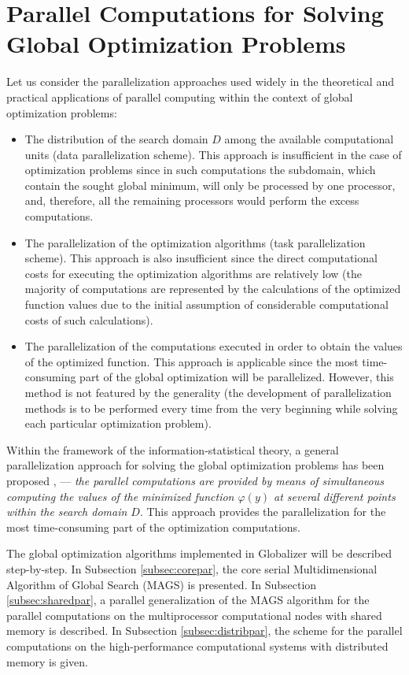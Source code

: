 \documentclass{naco}
\theoremstyle{definition}
\begin{document}
\section{Parallel Computations for Solving Global Optimization Problems}
\label{sec:parallel}
Let us consider the parallelization approaches used widely in the theoretical and
practical applications of parallel computing within the context of global optimization problems:
\begin{itemize}
  \item The distribution of the search domain \(D\) among the available computational units (data parallelization scheme). This approach is insufficient in the case of optimization problems since in such computations the subdomain, which contain the sought global minimum, will only be processed by one processor, and, therefore, all the remaining processors would perform the excess computations.
  \item The parallelization of the optimization algorithms (task parallelization scheme). This approach is also insufficient since the direct computational costs for executing the optimization algorithms are relatively low (the majority of computations are represented by the calculations of the optimized function values due to the initial assumption of considerable computational costs of such calculations).
  \item The parallelization of the computations executed in order to obtain the values of the optimized function. This approach is applicable since the most time-consuming part of the global optimization will be parallelized. However, this method is not featured by the generality (the development of parallelization methods is to be performed every time from the very beginning while solving each particular optimization problem).
\end{itemize}
\par
Within the framework of the information-statistical theory, a general parallelization
approach for solving the global optimization problems has been proposed \cite{stronginGergelBarkalovParGO}, \cite{strSergGO} --- \textit{the parallel computations are provided by means of simultaneous computing the values of the
minimized function \(\varphi(y)\) at several different points within the search domain \(D\)}.
This approach provides the parallelization for the most time-consuming part of the optimization computations.
\par
The global optimization algorithms implemented in Globalizer will be described step-by-step.
In Subsection \ref{subsec:corepar}, the core serial Multidimensional Algorithm of Global
Search (MAGS) is presented. In Subsection \ref{subsec:sharedpar}, a parallel generalization
of the MAGS algorithm for the parallel computations on the multiprocessor computational
nodes with shared memory is described. In Subsection \ref{subsec:distribpar}, the scheme
for the parallel computations on the high-performance computational systems with distributed memory is given.
\end{document}
